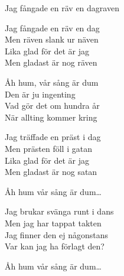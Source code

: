 \begin{song}{Jag fångade en räv en dag}{raven}
\begin{vers}
Jag fångade en räv en dag\\
Men räven slank ur näven\\
Lika glad för det är jag\\
Men gladast är nog räven\\
\end{vers}
\begin{vers}
  Åh hum, vår sång är dum\\
  Den är ju ingenting\\
  Vad gör det om hundra år\\
  När allting kommer kring\\
\end{vers}
\begin{vers}
Jag träffade en präst i dag\\
Men prästen föll i gatan\\
Lika glad för det är jag\\
Men gladast är nog satan\\
\end{vers}
\begin{vers}
  Åh hum vår sång är dum\ldots\\
\end{vers}
\begin{vers}
Jag brukar svänga runt i dans\\
Men jag har tappat takten\\
Jag finner den ej någonstans\\
Var kan jag ha förlagt den?\\
\end{vers}
\begin{vers}
  Åh hum vår sång är dum\ldots\\
\end{vers}
\end{song}
